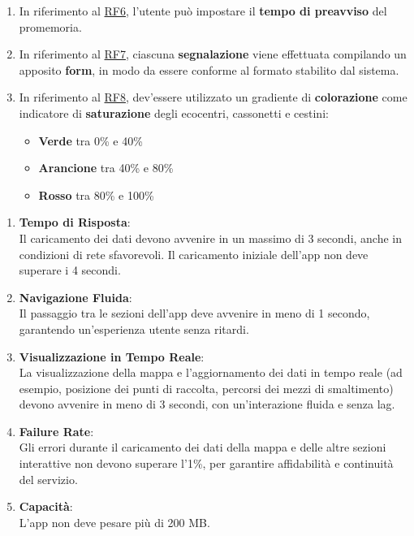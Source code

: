\begin{enumerate}[start=1,label=\textbf{RNF\theenumi}, labelwidth=4em, left=0pt, labelsep=1em, align=left]
    \item \label{itm:RNF7} In riferimento al \hyperref[itm:RF6]{RF6}, l'utente può impostare il \textbf{tempo di preavviso} del promemoria.
    
    \item \label{itm:RNF8} In riferimento al \hyperref[itm:RF7]{RF7}, ciascuna \textbf{segnalazione} viene effettuata compilando un apposito \textbf{form}, in modo da essere conforme al formato stabilito dal sistema.

    \item \label{itm:RNF9} In riferimento al \hyperref[itm:RF8]{RF8}, dev'essere utilizzato un gradiente di \textbf{colorazione} come indicatore di \textbf{saturazione} degli ecocentri, cassonetti e cestini:
    \begin{itemize}
        \item \textbf{Verde} tra 0\% e 40\% 
        \item \textbf{Arancione} tra 40\% e 80\%
        \item \textbf{Rosso} tra 80\% e 100\%
    \end{itemize}

\end{enumerate}

\begin{enumerate}[start=10,label=\textbf{RNF\theenumi}, labelwidth=4em, left=0pt, align=left, itemindent=-0.6em]

    \item \label{itm:RNF10}  \textbf{Tempo di Risposta}:\\Il caricamento dei dati devono avvenire in un massimo di 3 secondi, anche in condizioni di rete sfavorevoli. Il caricamento iniziale dell’app non deve superare i 4 secondi.
    
    \item \label{itm:RNF11}\textbf{Navigazione Fluida}:\\Il passaggio tra le sezioni dell’app deve avvenire in meno di 1 secondo, garantendo un’esperienza utente senza ritardi.
    
    \item \label{itm:RNF12} \textbf{Visualizzazione in Tempo Reale}:\\La visualizzazione della mappa e l’aggiornamento dei dati in tempo reale (ad esempio, posizione dei punti di raccolta, percorsi dei mezzi di smaltimento) devono avvenire in meno di 3 secondi, con un’interazione fluida e senza lag.
    
    \item \label{itm:RNF13}\textbf{Failure Rate}:\\Gli errori durante il caricamento dei dati della mappa e delle altre sezioni interattive non devono superare l’1\%, per garantire affidabilità e continuità del servizio.
    
    \item \label{itm:RNF14}\textbf{Capacità}:\\L’app non deve pesare più di 200 MB.
     
\end{enumerate}